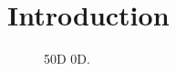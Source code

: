 \section{Introduction}
\lipsum[5]




\begin{figure}[h]
	\centering
    
	\caption{50D 0D.}
	\label{fig:controllerboardv2_}
\end{figure}